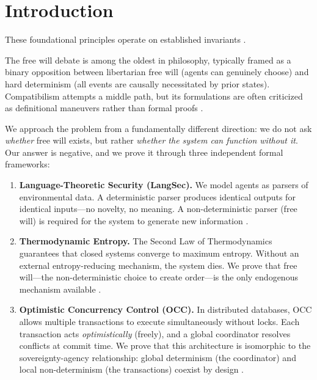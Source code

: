 \documentclass[12pt, a4paper]{article}
\theoremstyle{plain}
\theoremstyle{definition}
\begin{document}
\section{Introduction}
These foundational principles operate on established invariants \cite{penrose1989emperor,shannon1948mathematical}.\label{sec:intro}

The free will debate is among the oldest in philosophy, typically framed as a
binary opposition between libertarian free will (agents can genuinely choose)
and hard determinism (all events are causally necessitated by prior states).
Compatibilism attempts a middle path, but its formulations are often criticized
as definitional maneuvers rather than formal proofs \citep{Kane2005}.

We approach the problem from a fundamentally different direction: we do not
ask \emph{whether} free will exists, but rather \emph{whether the system
can function without it}. Our answer is negative, and we prove it through
three independent formal frameworks:

\begin{enumerate}[label=(\roman*)]
  \item \textbf{Language-Theoretic Security (LangSec).} We model agents as
    parsers of environmental data. A deterministic parser produces identical
    outputs for identical inputs---no novelty, no meaning. A non-deterministic
    parser (free will) is required for the system to generate new information
    \citep{Bratus2014}.

  \item \textbf{Thermodynamic Entropy.} The Second Law of Thermodynamics
    guarantees that closed systems converge to maximum entropy. Without an
    external entropy-reducing mechanism, the system dies. We prove that
    free will---the non-deterministic choice to create order---is the
    only endogenous mechanism available \citep{Shannon1948, Clausius1865}.

  \item \textbf{Optimistic Concurrency Control (OCC).} In distributed
    databases, OCC allows multiple transactions to execute simultaneously
    without locks. Each transaction acts \emph{optimistically} (freely),
    and a global coordinator resolves conflicts at commit time. We prove that
    this architecture is isomorphic to the sovereignty-agency relationship:
    global determinism (the coordinator) and local non-determinism (the
    transactions) coexist by design \citep{Kung1981}.
\end{enumerate}
\end{document}
